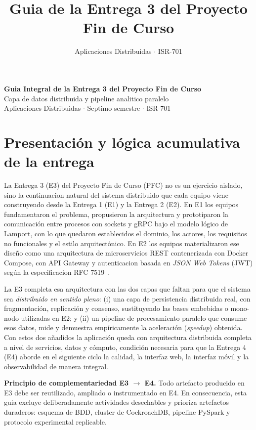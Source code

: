 \documentclass[11pt,a4paper]{article}
\title{Guia de la Entrega 3 del Proyecto Fin de Curso}
\author{Aplicaciones Distribuidas $\cdot$ ISR-701}
\date{}
\begin{document}
\thispagestyle{fancy}

\begin{center}
    {\Large\bfseries\color{uteqBlue} Guia Integral de la Entrega 3 del Proyecto Fin de Curso}\\[2pt]
    {\normalsize\color{uteqGray} Capa de datos distribuida y pipeline analitico paralelo}\\[2pt]
    {\small Aplicaciones Distribuidas $\cdot$ Septimo semestre $\cdot$ ISR-701}
\end{center}
\vspace{0.4em}


\section{Presentación y lógica acumulativa de la entrega}

    La Entrega 3 (E3) del Proyecto Fin de Curso (PFC) no es un ejercicio aislado, sino la continuacion natural del sistema distribuido que cada equipo viene construyendo desde la Entrega 1 (E1) y la Entrega 2 (E2). En E1 los equipos fundamentaron el problema, propusieron la arquitectura y prototiparon la comunicación entre procesos con sockets y gRPC bajo el modelo lógico de Lamport, con lo que quedaron establecidos el dominio, los actores, los requisitos no funcionales y el estilo arquitectónico. En E2 los equipos materializaron ese diseño como una arquitectura de microservicios REST contenerizada con Docker Compose, con API Gateway y autenticacion basada en \textit{JSON Web Tokens} (JWT) según la especificacion RFC 7519~\cite{Jones2015JWT,Fielding2000REST,Newman2021Microservices}.
    
    La E3 completa esa arquitectura con las dos capas que faltan para que el sistema sea \emph{distribuido en sentido pleno}: (i) una capa de persistencia distribuida real, con fragmentación, replicación y consenso, sustituyendo las bases embebidas o mono-nodo utilizadas en E2; y (ii) un pipeline de procesamiento paralelo que consume esos datos, mide y demuestra empíricamente la aceleración (\textit{speedup}) obtenida. Con estos dos añadidos la aplicación queda con arquitectura distribuida completa a nivel de servicios, datos y cómputo, condición necesaria para que la Entrega 4 (E4) aborde en el siguiente ciclo la calidad, la interfaz web, la interfaz móvil y la observabilidad de manera integral.
    
    \begin{noteBox}
        \textbf{Principio de complementariedad E3 $\rightarrow$ E4.} Todo artefacto producido en E3 debe ser reutilizado, ampliado o instrumentado en E4. En consecuencia, esta guia excluye deliberadamente actividades desechables y prioriza artefactos duraderos: esquema de BDD, cluster de CockroachDB, pipeline PySpark y protocolo experimental replicable.
    \end{noteBox}
\end{document}
